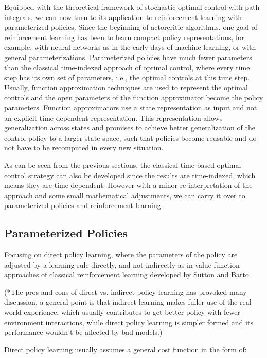 \documentclass[journal]{IEEEtran}
\begin{document}
Equipped with the theoretical framework of stochastic optimal control with path integrals, we can now turn to its application to reinforcement learning with parameterized policies. 
Since the beginning of actorcritic algorithms. one goal of reinforcement learning has been to learn compact policy representations, for example, with neural networks as in the early 
days of machine learning, or with general parameterizations. Parameterized policies have much fewer parameters than the classical time-indexed approach of optimal control, where every 
time step has its own set of parameters, i.e., the optimal controls at this time step. Usually, function approximation techniques are used to represent the optimal controls and the 
open parameters of the function approximator become the policy parameters. Function approximators use a state representation as input and not an explicit time dependent representation. 
This representation allows generalization across states and promises to achieve better generalization of the control policy to a larger state space, such that policies become reusable 
and do not have to be recomputed in every new situation.

As can be seen from the previous sections, the classical time-based optimal control strategy can also be developed since the results are time-indexed, which means they are time dependent.
However with a minor re-interpretation of the approach and some small mathematical adjustments, we can carry it over to parameterized policies and reinforcement learning.


\subsection{Parameterized Policies}

Focusing on direct policy learning, where the parameters of the policy are adjusted by a learning rule directly, and not indirectly as in value function approaches of classical reinforcement learning
developed by Sutton and Barto.

(*The pros and cons of direct vs. indirect policy learning has provoked many discussion, a general point is that indirect learning makes fuller use of the real world experience, which usually contributes to get better
policy with fewer environment interactions, while direct policy learning is simpler formed and its performance wouldn't be affected by bad models.)

Direct policy learning usually assumes a general cost function in the form of:
\end{document}
